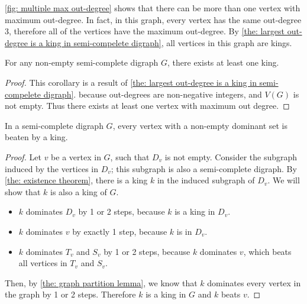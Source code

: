   \cref{fig: multiple max out-degree} shows that
  there can be more than one vertex with maximum out-degree.
  In fact, in this graph,
  every vertex has the same out-degree 3,
  therefore all of the vertices have the maximum out-degree.
  By \cref{the: largest out-degree is a king in semi-compelete digraph},
  all vertices in this graph are kings.

  \begin{corollary}\label{the: existence theorem}
    For any non-empty semi-complete digraph \(G\),
    there exists at least one king.
  \end{corollary}

  \begin{proof}
    This corollary is a result of \cref{the: largest out-degree is a king in semi-compelete digraph}.
    because out-degrees are non-negative integers,
    and \(V(G)\) is not empty.
    Thus there exists at least one vertex with maximum out degree.
  \end{proof}

  \begin{theorem}\label{the: beaten by king theorem}
    In a semi-complete digraph \(G\),
    every vertex with a non-empty dominant set
    is beaten by a king.
  \end{theorem}

  \begin{proof}
    Let \(v\) be a vertex in \(G\), such that \(D_v\) is not empty.
    Consider the subgraph induced by the vertices in \(D_v\);
    this subgraph is also a semi-complete digraph.
    By \cref{the: existence theorem},
    there is a king \(k\) in the induced subgraph of \(D_v\).
    We will show that \(k\) is also a king of \(G\).
    \begin{itemize}
      \item
        \(k\) dominates \(D_v\) by 1 or 2 steps,
        because \(k\) is a king in \(D_v\).
      \item
        \(k\) dominates \(v\) by exactly 1 step,
        because \(k\) is in \(D_v\).
      \item
        \(k\) dominates \(T_v\) and \(S_v\) by 1 or 2 steps,
        because \(k\) dominates \(v\),
        which beats all vertices in \(T_v\) and \(S_v\).
    \end{itemize}

    Then, by \cref{the: graph partition lemma},
    we know that \(k\) dominates
    every vertex in the graph by 1 or 2 steps.
    Therefore \(k\) is a king in \(G\) and \(k\) beats \(v\).
  \end{proof}

